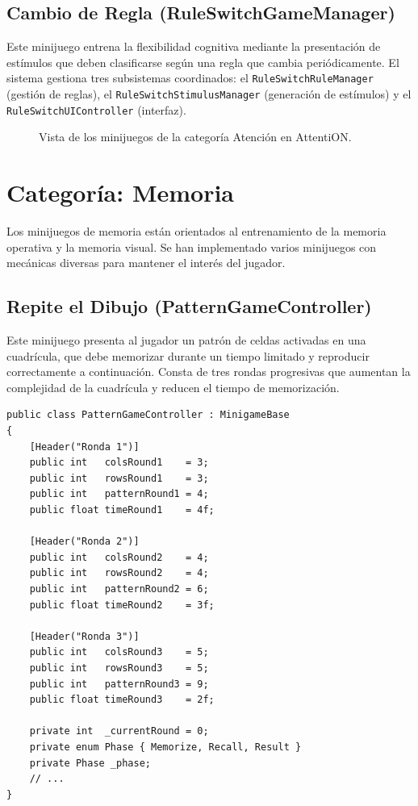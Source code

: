 \documentclass[12pt, a4paper]{report}
\begin{document}
\subsection{Cambio de Regla (RuleSwitchGameManager)}

Este minijuego entrena la flexibilidad cognitiva mediante la presentación de
estímulos que deben clasificarse según una regla que cambia periódicamente.
El sistema gestiona tres subsistemas coordinados: el
\texttt{RuleSwitchRuleManager} (gestión de reglas), el
\texttt{RuleSwitchStimulusManager} (generación de estímulos) y el
\texttt{RuleSwitchUIController} (interfaz).

\begin{figure}[H]
  \centering
  \caption{Vista de los minijuegos de la categoría Atención en AttentiON.}
  \label{fig:atencion}
\end{figure}

\section{Categoría: Memoria}

Los minijuegos de memoria están orientados al entrenamiento de la memoria
operativa y la memoria visual. Se han implementado varios minijuegos con
mecánicas diversas para mantener el interés del jugador.

\subsection{Repite el Dibujo (PatternGameController)}

Este minijuego presenta al jugador un patrón de celdas activadas en una
cuadrícula, que debe memorizar durante un tiempo limitado y reproducir
correctamente a continuación. Consta de tres rondas progresivas que aumentan
la complejidad de la cuadrícula y reducen el tiempo de memorización.

\begin{lstlisting}[caption={PatternGameController.cs — Configuración de rondas},
                   label={lst:pattern}]
public class PatternGameController : MinigameBase
{
    [Header("Ronda 1")]
    public int   colsRound1    = 3;
    public int   rowsRound1    = 3;
    public int   patternRound1 = 4;
    public float timeRound1    = 4f;

    [Header("Ronda 2")]
    public int   colsRound2    = 4;
    public int   rowsRound2    = 4;
    public int   patternRound2 = 6;
    public float timeRound2    = 3f;

    [Header("Ronda 3")]
    public int   colsRound3    = 5;
    public int   rowsRound3    = 5;
    public int   patternRound3 = 9;
    public float timeRound3    = 2f;

    private int  _currentRound = 0;
    private enum Phase { Memorize, Recall, Result }
    private Phase _phase;
    // ...
}
\end{lstlisting}
\end{document}
